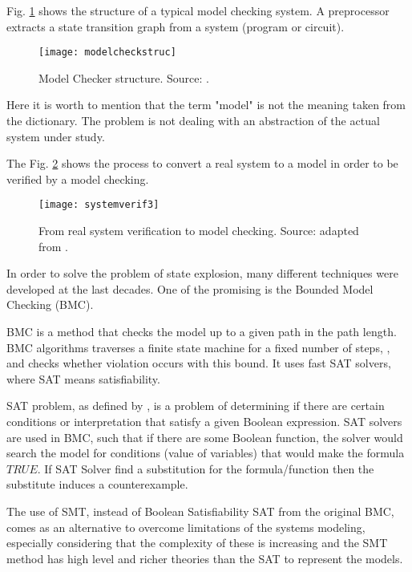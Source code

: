 Fig. \ref{fig:modelcheckstruc} shows the structure of a typical model checking system. A preprocessor extracts a state transition graph from a system (program or circuit).

\begin{figure}[h]
\texttt{[image: modelcheckstruc]}
\centering
\caption{Model Checker structure. Source: \cite{Clarke2008}.}
\label{fig:modelcheckstruc}
\end{figure}

Here it is worth to mention that the term "model" is not the meaning taken from the dictionary. The problem is not dealing with an abstraction of the actual system under study. 

The Fig. \ref{fig:systemverif} shows the process to convert a real system to a model in order to be verified by a model checking. 

\begin{figure}[h]
\texttt{[image: systemverif3]}
\centering
\caption{From real system verification to model checking. Source: adapted from \cite{Clarke2008}.}
\label{fig:systemverif}
\end{figure}

In order to solve the problem of state explosion, many different techniques were developed at the last decades. One of the promising is the Bounded Model Checking (BMC). 

BMC is a method that checks the model up to a given path in the path length. BMC algorithms traverses a finite state machine for a fixed number of steps, , and checks whether violation occurs with this bound. It uses fast SAT solvers, where SAT means satisfiability. 

SAT problem, as defined by \cite{Clarke2008}, is a problem of determining if there are certain conditions or interpretation that satisfy a given Boolean expression. SAT solvers are used in BMC, such that if there are some Boolean function, the solver would search the model for conditions (value of variables) that would make the formula $TRUE$. If SAT Solver find a substitution for the formula/function then the substitute induces a counterexample.  

%
The use of SMT, instead of Boolean Satisfiability SAT from the original BMC, comes as an alternative to overcome limitations of the systems modeling, especially considering that the complexity of these is increasing and the SMT method has high level and richer theories than the SAT to represent the models. 

